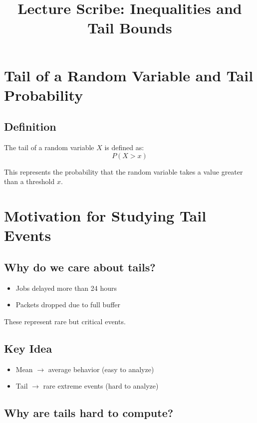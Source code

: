 \documentclass[12pt]{article}
\title{Lecture Scribe: Inequalities and Tail Bounds}
\author{}
\date{}
\begin{document}
\maketitle

\section{Tail of a Random Variable and Tail Probability}

\subsection{Definition}

The tail of a random variable $X$ is defined as:
\[
P(X > x)
\]

This represents the probability that the random variable takes a value greater than a threshold $x$.

\section{Motivation for Studying Tail Events}

\subsection{Why do we care about tails?}

\begin{itemize}
    \item Jobs delayed more than 24 hours
    \item Packets dropped due to full buffer
\end{itemize}

These represent rare but critical events.

\subsection{Key Idea}

\begin{itemize}
    \item Mean $\rightarrow$ average behavior (easy to analyze)
    \item Tail $\rightarrow$ rare extreme events (hard to analyze)
\end{itemize}

\subsection{Why are tails hard to compute?}
\end{document}
